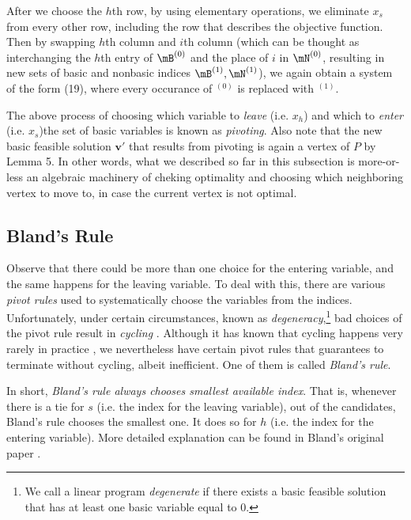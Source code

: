 \documentclass{article}
\renewcommand{\vec}{\mathbf}
\begin{document}
After we choose the $h$th row, by using elementary operations, we eliminate $x_s$ from every other row, including the row that describes the objective function. Then by swapping $h$th column and $i$th column (which can be thought as interchanging the $h$th entry of $\mB^{\left( 0 \right) }$ and the place of $i$ in $\mN^{\left( 0 \right) }$, resulting in new sets of basic and nonbasic indices $\mB^{\left( 1 \right) }, \mN^{\left( 1 \right) }$), we again obtain a system of the form (19), where every occurance of $^{\left( 0 \right) }$ is replaced with $^{\left( 1 \right) }$.

The above process of choosing which variable to \textit{leave} (i.e. $x_h$) and which to \textit{enter} (i.e. $x_s$)the set of basic variables is known as \textit{pivoting}. Also note that the new basic feasible solution $\vec{v}'$ that results from pivoting is again a vertex of $P$ by Lemma 5. In other words, what we described so far in this subsection is more-or-less an algebraic machinery of cheking optimality and choosing which neighboring vertex to move to, in case the current vertex is not optimal.

\subsection{Bland's Rule}

Observe that there could be more than one choice for the entering variable, and the same happens for the leaving variable. To deal with this, there are various \textit{pivot rules} used to systematically choose the variables from the indices. Unfortunately, under certain circumstances, known as \textit{degeneracy},\footnote{We call a linear program \textit{degenerate} if there exists a basic feasible solution that has at least one basic variable equal to 0.} bad choices of the pivot rule result in \textit{cycling} \cite{UULP}. Although it has known that cycling happens very rarely in practice \cite{UULP}, we nevertheless have certain pivot rules that guarantees to terminate without cycling, albeit inefficient. One of them is called \textit{Bland's rule}.

In short, \textit{Bland's rule always chooses smallest available index}. That is, whenever there is a tie for $s$ (i.e. the index for the leaving variable), out of the candidates, Bland's rule chooses the smallest one. It does so for $h$ (i.e. the index for the entering variable). More detailed explanation can be found in Bland's original paper \cite{NFPR}.
\end{document}
